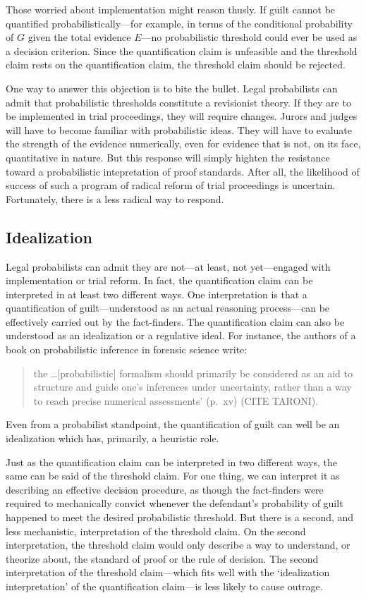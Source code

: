 \documentclass[10pt,dvipsnames,enabledeprecatedfontcommands]{scrartcl}
\begin{document}
\noindent
Those worried about implementation might reason thusly. If guilt cannot
be quantified probabilistically---for example, in terms of the
conditional probability of \(G\) given the total evidence \(E\)---no
probabilistic threshold could ever be used as a decision criterion.
Since the quantification claim is unfeasible and the threshold claim
rests on the quantification claim, the threshold claim should be
rejected.

One way to answer this objection is to bite the bullet. Legal
probabilists can admit that probabilistic thresholds constitute a
revisionist theory. If they are to be implemented in trial proceedings,
they will require changes. Jurors and judges will have to become
familiar with probabilistic ideas. They will have to evaluate the
strength of the evidence numerically, even for evidence that is not, on
its face, quantitative in nature. But this response will simply highten
the resistance toward a probabilistic intepretation of proof standards.
After all, the likelihood of success of such a program of radical reform
of trial proceedings is uncertain. Fortunately, there is a less radical
way to respond.

\subsection{Idealization}\label{idealization}

Legal probabilists can admit they are not---at least, not yet---engaged
with implementation or trial reform. In fact, the quantification claim
can be interpreted in at least two different ways. One interpretation is
that a quantification of guilt---understood as an actual reasoning
process---can be effectively carried out by the fact-finders. The
quantification claim can also be understood as an idealization or a
regulative ideal. For instance, the authors of a book on probabilistic
inference in forensic science write:

\begin{quote}
the \dots [probabilistic] formalism should primarily be considered as an aid to structure and guide one's inferences under uncertainty, rather than a way to reach precise numerical assessments' (p.\ xv) (CITE TARONI).
\end{quote}

\noindent
Even from a probabilist standpoint, the quantification of guilt can well
be an idealization which has, primarily, a heuristic role.

Just as the quantification claim can be interpreted in two different
ways, the same can be said of the threshold claim. For one thing, we can
interpret it as describing an effective decision procedure, as though
the fact-finders were required to mechanically convict whenever the
defendant's probability of guilt happened to meet the desired
probabilistic threshold. But there is a second, and less mechanistic,
interpretation of the threshold claim. On the second interpretation, the
threshold claim would only describe a way to understand, or theorize
about, the standard of proof or the rule of decision. The second
interpretation of the threshold claim---which fits well with the
`idealization interpretation' of the quantification claim---is less
likely to cause outrage.
\end{document}
